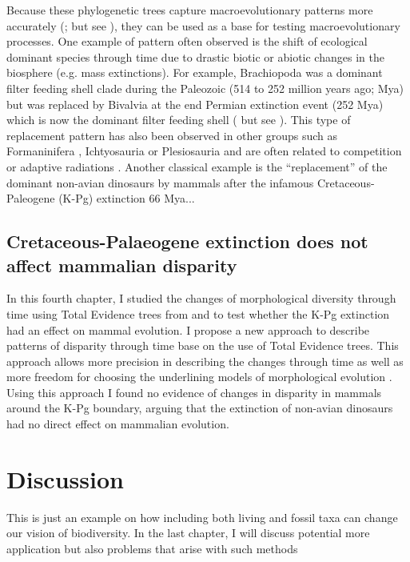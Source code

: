 Because these phylogenetic trees capture macroevolutionary patterns more accurately (\citealt{ronquista2012,schragocombining2013,slaterphylogenetic2013,beckancient2014,Dembo2015}; but see \citealt{Arcila2015131}), they can be used as a base for testing macroevolutionary processes.
One example of pattern often observed is the shift of ecological dominant species through time due to drastic biotic or abiotic changes in the biosphere (e.g. mass extinctions).
For example, Brachiopoda was a dominant filter feeding shell clade during the Paleozoic (514 to 252 million years ago; Mya) but was replaced by Bivalvia at the end Permian extinction event (252 Mya) which is now the dominant filter feeding shell (\citealt{Sepkiski1981,CLAPHAM01102006} but see \citealt{Payne22052014}).
This type of replacement pattern has also been observed in other groups such as Formaninifera \citep{Coxall01042006}, Ichtyosauria \citep{thorneresetting2011} or Plesiosauria \citealt{bensonfaunal2014} and are often related to competition \citep{brusatte50} or adaptive radiations \citep{Losos2010}.
Another classical example is the ``replacement'' of the dominant non-avian dinosaurs by mammals after the infamous Cretaceous-Paleogene (K-Pg) extinction 66 Mya...

\subsection{Cretaceous-Palaeogene extinction does not affect mammalian disparity}
In this fourth chapter, I studied the changes of morphological diversity \citep[or disparity;][]{Wills1994} through time using Total Evidence trees from \cite{slaterphylogenetic2013} and \cite{beckancient2014} to test whether the K-Pg extinction had an effect on mammal evolution.
I propose a new approach to describe patterns of disparity through time base on the use of Total Evidence trees.
This approach allows more precision in describing the changes through time as well as more freedom for choosing the underlining models of morphological evolution \citep[e.g. punctuated or gradual;][]{Hunt21042015}.
Using this approach I found no evidence of changes in disparity in mammals around the K-Pg boundary, arguing that the extinction of non-avian dinosaurs had no direct effect on mammalian evolution.


\section{Discussion} %
This is just an example on how including both living and fossil taxa can change our vision of biodiversity.
In the last chapter, I will discuss potential more application but also problems that arise with such methods


